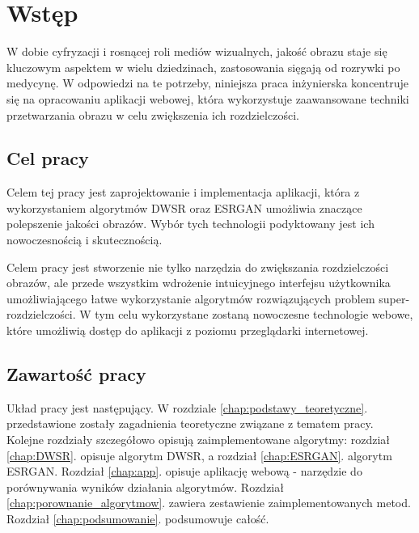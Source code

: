 \chapter{Wstęp}

W dobie cyfryzacji i rosnącej roli mediów wizualnych, jakość obrazu staje się kluczowym aspektem w wielu dziedzinach, zastosowania sięgają od rozrywki po medycynę. W odpowiedzi na te potrzeby, niniejsza praca inżynierska koncentruje się na opracowaniu aplikacji webowej, która wykorzystuje zaawansowane techniki przetwarzania obrazu w celu zwiększenia ich rozdzielczości.

\section{Cel pracy}

Celem tej pracy jest zaprojektowanie i implementacja aplikacji, która z wykorzystaniem algorytmów DWSR \cite{guo2017deep} oraz ESRGAN \cite{wang2018esrgan} umożliwia znaczące polepszenie jakości obrazów. Wybór tych technologii podyktowany jest ich nowoczesnością i skutecznością.


Celem pracy jest stworzenie nie tylko narzędzia do zwiększania rozdzielczości obrazów, ale przede wszystkim wdrożenie intuicyjnego interfejsu użytkownika umożliwiającego łatwe wykorzystanie algorytmów rozwiązujących problem super-rozdzielczości. W tym celu wykorzystane zostaną nowoczesne technologie webowe, które umożliwią dostęp do aplikacji z poziomu przeglądarki internetowej.

\section{Zawartość pracy}

Układ pracy jest następujący. W rozdziale \ref{chap:podstawy_teoretyczne}. przedstawione zostały zagadnienia teoretyczne związane z tematem pracy. Kolejne rozdziały szczegółowo opisują zaimplementowane algorytmy: rozdział \ref{chap:DWSR}. opisuje algorytm DWSR, a rozdział \ref{chap:ESRGAN}. algorytm ESRGAN. Rozdział \ref{chap:app}. opisuje aplikację webową - narzędzie do porównywania wyników działania algorytmów. Rozdział \ref{chap:porownanie_algorytmow}. zawiera zestawienie zaimplementowanych metod. Rozdział \ref{chap:podsumowanie}. podsumowuje całość.